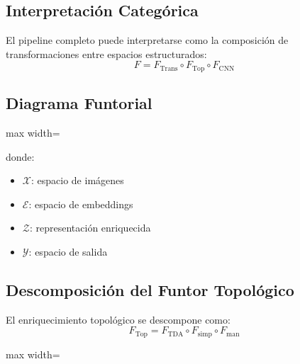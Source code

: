\documentclass[conference]{IEEEtran}
\begin{document}
\subsection{Interpretación Categórica}

El pipeline completo puede interpretarse como la composición de transformaciones entre espacios estructurados:
\[
F = F_{\text{Trans}} \circ F_{\text{Top}} \circ F_{\text{CNN}}
\]


\subsection{Diagrama Funtorial}

\begin{center}
\begin{adjustbox}{max width=\columnwidth}
\end{adjustbox}
\end{center}

donde:
\begin{itemize}
\item $\mathcal{X}$: espacio de imágenes
\item $\mathcal{E}$: espacio de embeddings
\item $\mathcal{Z}$: representación enriquecida
\item $\mathcal{Y}$: espacio de salida
\end{itemize}

\subsection{Descomposición del Funtor Topológico}

El enriquecimiento topológico se descompone como:
\[
F_{\text{Top}} = F_{\text{TDA}} \circ F_{\text{simp}} \circ F_{\text{man}}
\]

\begin{center}
\begin{adjustbox}{max width=\columnwidth}
\end{adjustbox}
\end{center}
\end{document}
